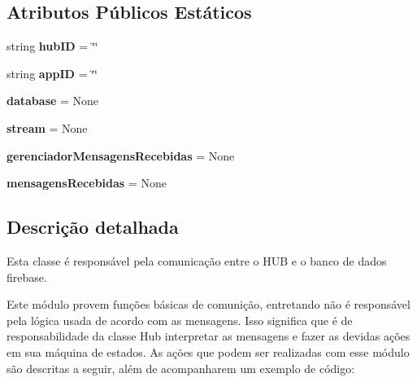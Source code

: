 \subsection*{Atributos Públicos Estáticos}
\begin{DoxyCompactItemize}
\item 
string {\bfseries hub\+ID} = \char`\"{}\char`\"{}\hypertarget{classhub_para_firebase_1_1_hub_para_firebase_a877a7af6deac7745ca493313cc812936}{}\label{classhub_para_firebase_1_1_hub_para_firebase_a877a7af6deac7745ca493313cc812936}

\item 
string {\bfseries app\+ID} = \char`\"{}\char`\"{}\hypertarget{classhub_para_firebase_1_1_hub_para_firebase_a1151963c2e4dea5ea944b2082a629a07}{}\label{classhub_para_firebase_1_1_hub_para_firebase_a1151963c2e4dea5ea944b2082a629a07}

\item 
{\bfseries database} = None\hypertarget{classhub_para_firebase_1_1_hub_para_firebase_ad897e9d2142426f09b8154ae0e0ab374}{}\label{classhub_para_firebase_1_1_hub_para_firebase_ad897e9d2142426f09b8154ae0e0ab374}

\item 
{\bfseries stream} = None\hypertarget{classhub_para_firebase_1_1_hub_para_firebase_afc660542885ce7717ef17d4ddb4f9b76}{}\label{classhub_para_firebase_1_1_hub_para_firebase_afc660542885ce7717ef17d4ddb4f9b76}

\item 
{\bfseries gerenciador\+Mensagens\+Recebidas} = None\hypertarget{classhub_para_firebase_1_1_hub_para_firebase_ae5cbb5c32dda53f7f6a6c1b5685d2815}{}\label{classhub_para_firebase_1_1_hub_para_firebase_ae5cbb5c32dda53f7f6a6c1b5685d2815}

\item 
{\bfseries mensagens\+Recebidas} = None\hypertarget{classhub_para_firebase_1_1_hub_para_firebase_aed56c55b4e098c7c77ffee2759801901}{}\label{classhub_para_firebase_1_1_hub_para_firebase_aed56c55b4e098c7c77ffee2759801901}

\end{DoxyCompactItemize}


\subsection{Descrição detalhada}
Esta classe é responsável pela comunicação entre o H\+UB e o banco de dados firebase. 

Este módulo provem funções básicas de comunição, entretando não é responsável pela lógica usada de acordo com as mensagens. Isso significa que é de responsabilidade da classe Hub interpretar as mensagens e fazer as devidas ações em sua máquina de estados. As ações que podem ser realizadas com esse módulo são descritas a seguir, além de acompanharem um exemplo de código\+:

